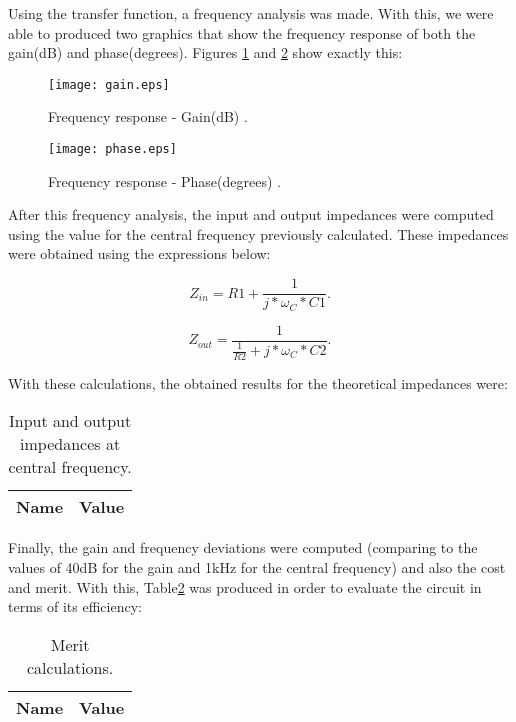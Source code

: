 \par Using the transfer function, a frequency analysis was made. With this, we were able to produced two graphics that show the frequency response of both the gain(dB) and phase(degrees). Figures \ref{fig:gain} and \ref{fig:phase} show exactly this:

\begin{figure}[h] \centering
\texttt{[image: gain.eps]}
\caption{Frequency response - Gain(dB) .}
\label{fig:gain}
\end{figure}

\newpage

\begin{figure}[h] \centering
\texttt{[image: phase.eps]}
\caption{Frequency response - Phase(degrees) .}
\label{fig:phase}
\end{figure}


\par After this frequency analysis, the input and output impedances were computed using the value for the central frequency previously calculated. These impedances were obtained using the expressions below:

\begin{equation}
  Z_{in} = R1 +  \frac{1}{j*\omega_{C}*C1}.
  \label{eq:eq4}
\end{equation}

\begin{equation}
  Z_{out} = \frac{1}{\frac{1}{R2} + j*\omega_{C}*C2}.
  \label{eq:eq5}
\end{equation}

\par With these calculations, the obtained results for the theoretical impedances were:

\begin{table}[h]
  \centering
  \begin{tabular}{|l|r|}
    \hline    
    {\bf Name} & {\bf Value}\\ \hline
    
  \end{tabular}
  \caption{Input and output impedances at central frequency.}
  \label{tab:tr2}
\end{table}

\newpage

\par Finally, the gain and frequency deviations were computed (comparing to the values of 40dB for the gain and 1kHz for the central frequency) and also the cost and merit. With this, Table\ref{tab:tr3} was produced in order to evaluate the circuit in terms of its efficiency:

\begin{table}[h]
  \centering
  \begin{tabular}{|l|r|}
    \hline    
    {\bf Name} & {\bf Value}\\ \hline
    
  \end{tabular}
  \caption{Merit calculations.}
  \label{tab:tr3}
\end{table}

\newpage
